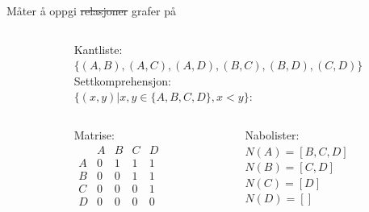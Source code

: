 \begin{frame}[fragile]{Måter å oppgi \sout{relasjoner} grafer på}
    \begin{columns}
        \begin{column}{0.3\textwidth}
        \end{column}
        \begin{column}{0.65\textwidth}
            Kantliste:\\
            $\{(A, B), (A, C), (A, D), (B, C), (B, D), (C, D)\}$\\[5mm]
            Settkomprehensjon:\\
            $\{(x, y) | x, y \in \{A,B,C,D\}, x < y\}$:\\[5mm]
            \begin{columns}
                \begin{column}{0.27\textwidth}
                    Matrise:\\
                    \begin{math}
                        \begin{matrix}
                              & A & B & C & D\\
                            A & 0 & 1 & 1 & 1\\
                            B & 0 & 0 & 1 & 1\\
                            C & 0 & 0 & 0 & 1\\
                            D & 0 & 0 & 0 & 0
                        \end{matrix}
                    \end{math}
                \end{column}
                \begin{column}{0.38\textwidth}
                    Nabolister:\\        
                    $N(A) = [B, C, D]$\\
                    $N(B) = [C, D]$\\
                    $N(C) = [D]$\\
                    $N(D) = []$
                \end{column} 
            \end{columns}
        \end{column}
    \end{columns}
\end{frame}

